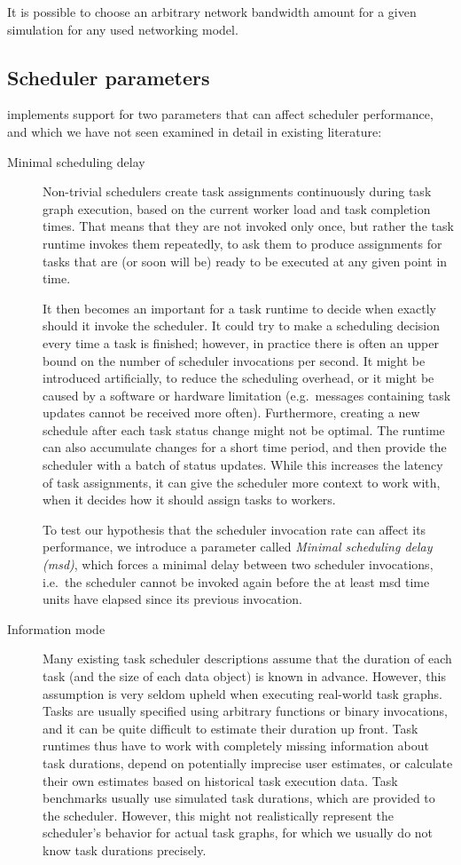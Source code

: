It is possible to choose an arbitrary network bandwidth amount for a given simulation for any used
networking model.

\subsection{Scheduler parameters}
\estee{} implements support for two parameters that can affect scheduler
performance, and which we have not seen examined in detail in existing literature:
\begin{description}
	\item[Minimal scheduling delay] Non-trivial schedulers create task assignments continuously during task graph execution, based on
		the current worker load and task completion times. That means that they are not invoked only once,
		but rather the task runtime invokes them repeatedly, to ask them to produce assignments for tasks
		that are (or soon will be) ready to be executed at any given point in time.

		It then becomes an important for a task runtime to decide when exactly should it invoke the
		scheduler. It could try to make a scheduling decision every time a task is finished; however, in
		practice there is often an upper bound on the number of scheduler invocations per second. It might
		be introduced artificially, to reduce the scheduling overhead, or it might be caused by a software
		or hardware limitation (e.g.\ messages containing task updates cannot be received more often).
		Furthermore, creating a new schedule after each task status change might not be optimal. The
		runtime can also accumulate changes for a short time period, and then provide the scheduler with a
		batch of status updates. While this increases the latency of task assignments, it can give the
		scheduler more context to work with, when it decides how it should assign tasks to workers.

		To test our hypothesis that the scheduler invocation rate can affect its performance, we introduce
		a parameter called \emph{Minimal scheduling delay (\acrshort{msd})}, which forces a minimal delay between two scheduler
		invocations, i.e.\ the scheduler cannot be invoked again before the at least
		\gls{msd} time units have elapsed since its previous invocation.
	\item[Information mode] Many existing task scheduler descriptions assume that the duration of each task (and the size of
		each data object) is known in advance. However, this assumption is very seldom upheld when
		executing real-world task graphs. Tasks are usually specified using arbitrary functions or binary
		invocations, and it can be quite difficult to estimate their duration up front. Task runtimes thus
		have to work with completely missing information about task durations, depend on potentially
		imprecise user estimates, or calculate their own estimates based on historical task execution data.
		Task benchmarks usually use simulated task durations, which are provided to the scheduler. However,
		this might not realistically represent the scheduler's behavior for actual task graphs, for which
		we usually do not know task durations precisely.


\end{description}

